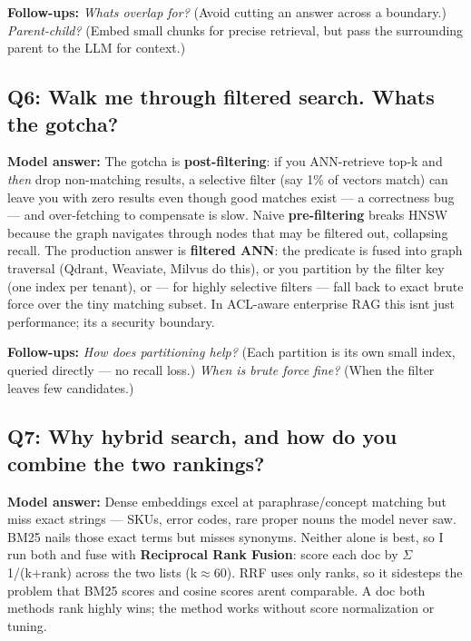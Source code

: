\documentclass[11pt]{article}
\begin{document}
\textbf{Follow-ups:} \emph{What\textquotesingle s overlap for?} (Avoid cutting an answer across a boundary.) \emph{Parent-child?} (Embed small chunks for precise retrieval, but pass the surrounding parent to the LLM for context.)

\subsection{Q6: Walk me through filtered search. What\textquotesingle s the gotcha?}\label{q6-walk-me-through-filtered-search-whats-the-gotcha}

\textbf{Model answer:} The gotcha is \textbf{post-filtering}: if you ANN-retrieve top-k and \emph{then} drop non-matching results, a selective filter (say 1\% of vectors match) can leave you with zero results even though good matches exist --- a correctness bug --- and over-fetching to compensate is slow. Naive \textbf{pre-filtering} breaks HNSW because the graph navigates through nodes that may be filtered out, collapsing recall. The production answer is \textbf{filtered ANN}: the predicate is fused into graph traversal (Qdrant, Weaviate, Milvus do this), or you partition by the filter key (one index per tenant), or --- for highly selective filters --- fall back to exact brute force over the tiny matching subset. In ACL-aware enterprise RAG this isn\textquotesingle t just performance; it\textquotesingle s a security boundary.

\textbf{Follow-ups:} \emph{How does partitioning help?} (Each partition is its own small index, queried directly --- no recall loss.) \emph{When is brute force fine?} (When the filter leaves few candidates.)

\subsection{Q7: Why hybrid search, and how do you combine the two rankings?}\label{q7-why-hybrid-search-and-how-do-you-combine-the-two-rankings}

\textbf{Model answer:} Dense embeddings excel at paraphrase/concept matching but miss exact strings --- SKUs, error codes, rare proper nouns the model never saw. BM25 nails those exact terms but misses synonyms. Neither alone is best, so I run both and fuse with \textbf{Reciprocal Rank Fusion}: score each doc by \(\Sigma\) 1/(k+rank) across the two lists (k\(\approx\)60). RRF uses only ranks, so it sidesteps the problem that BM25 scores and cosine scores aren\textquotesingle t comparable. A doc both methods rank highly wins; the method works without score normalization or tuning.
\end{document}
